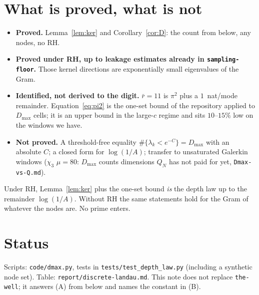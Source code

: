 \documentclass[11pt]{article}
\theoremstyle{remark}\newtheorem*{remark}{Remark}
\begin{document}
\section{What is proved, what is not}
\begin{itemize}
\item \textbf{Proved.} Lemma~\ref{lem:ker} and Corollary~\ref{cor:D}:
the count from below, any nodes, no RH.
\item \textbf{Proved under RH, up to leakage estimates already in
\texttt{sampling-floor}.} Those kernel directions are exponentially
small eigenvalues of the Gram.
\item \textbf{Identified, not derived to the digit.} $\bar r=11$ is
$\pi^2$ plus a $1$~nat/mode remainder. Equation~\eqref{eq:pi2} is the
one-set bound of the repository applied to $D_{\max}$ cells; it is an
upper bound in the large-$c$ regime and sits $10$--$15\%$ low on the
windows we have.
\item \textbf{Not proved.} A threshold-free equality
$\#\{\lambda_k<e^{-C}\}=D_{\max}$ with an absolute $C$; a closed form
for $\log(1/A)$; transfer to unsaturated Galerkin windows
($\chi_3$ $\mu=80$: $D_{\max}$ counts dimensions $Q_N$ has not paid
for yet, \texttt{Dmax-vs-Q.md}).
\end{itemize}
Under RH, Lemma~\ref{lem:ker} plus the one-set bound \emph{is} the depth
law up to the remainder $\log(1/A)$. Without RH the same statements
hold for the Gram of whatever the nodes are. No prime enters.

\section*{Status}
Scripts: \texttt{code/dmax.py}, tests in \texttt{tests/test\_depth\_law.py}
(including a synthetic node set). Table: \texttt{report/discrete-landau.md}.
This note does not replace \texttt{the-well}; it answers (A) from below
and names the constant in (B).
\end{document}
